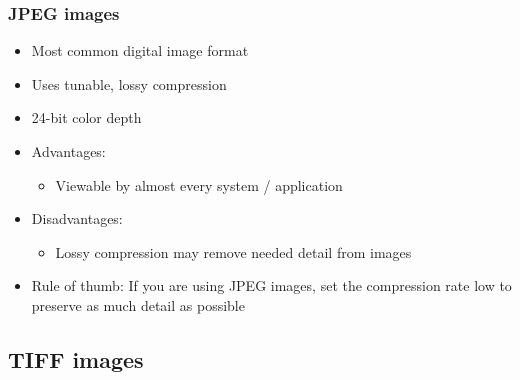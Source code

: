 \documentclass{beamer}
\begin{document}
\begin{frame}
	\frametitle{JPEG images}

	\begin{itemize}

		\item Most common digital image format

		\item Uses tunable, lossy compression

		\item 24-bit color depth

		\item Advantages:

		\begin{itemize}

			\item Viewable by almost every system / application

		\end{itemize}

		\item Disadvantages:

		\begin{itemize}

			\item Lossy compression may remove needed detail from images

		\end{itemize}

		\item Rule of thumb: If you are using JPEG images, set the compression rate low to preserve as much detail as possible

	\end{itemize}

\end{frame}

\subsection{TIFF images}
\end{document}
